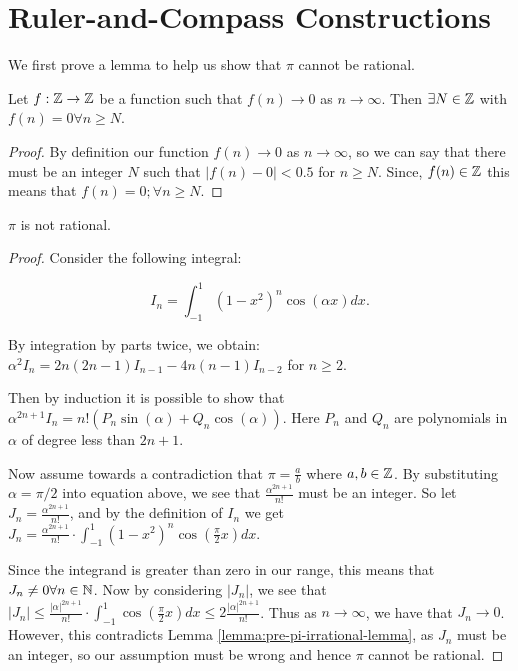 \section{Ruler-and-Compass Constructions} \label{sec:construction}
We first prove a lemma to help us show that $\pi$ cannot be rational.

\begin{lemma}\label{lemma:pre-pi-irrational-lemma}
    Let $f:\mathbb Z \rightarrow \mathbb Z$ be a function such that $f(n)\rightarrow 0$ as $n \rightarrow \infty$. Then $\exists N \in \mathbb Z$ with $f(n)=0 \forall n\geq N$.
\end{lemma}

\begin{proof}
    By definition our function $f(n) \rightarrow 0$ as $n \rightarrow \infty$, so we can say that there must be an integer $N$ such that $|f(n)-0|<0.5$ for $n\geq N$. Since, $f(n) \in \mathbb Z$ this means that $f(n)=0; \forall n \geq N$.
\end{proof}

\begin{theorem}
    $\pi$ is not rational.
\end{theorem}

\begin{proof}

    Consider the following integral:

    $$I_n = \int_{-1}^{1} (1-x^2)^n \cos(\alpha x)dx. $$

    By integration by parts twice, we obtain:
    $\alpha^2I_n=2n(2n-1)I_{n-1}-4n(n-1)I_{n-2}$ for $n\geq 2$.

    Then by induction it is possible to show that $\alpha^{2n+1}I_n=n!(P_n \sin(\alpha)+Q_n \cos(\alpha))$.
    Here $P_n$ and $Q_n$ are polynomials in $\alpha$ of degree less than $2n+1$.

    Now assume towards a contradiction that $\pi = \frac{a}{b}$ where $a,b\in \mathbb Z$. By substituting $\alpha = \pi/2$ into equation above, we see that $\frac{\alpha^{2n+1}}{n!}$ must be an integer. So let $J_n = \frac{\alpha^{2n+1}}{n!}$, and by the definition of $I_n$ we get $J_n = \frac{\alpha^{2n+1}}{n!}\cdot \int_{-1}^{1} (1-x^2)^n \cos(\frac{\pi}{2} x)dx$.

    Since the integrand is greater than zero in our range, this means that $J_n \neq 0 \forall n \in \mathbb N$. Now by considering $|J_n|$, we see that $|J_n| \leq \frac{|\alpha|^{2n+1}}{n!} \cdot \int_{-1}^1 \cos(\frac{\pi}{2}x)dx \leq 2\frac{|\alpha|^{2n+1}}{n!}$. Thus as $n\rightarrow \infty$, we have that $J_n\rightarrow 0$. However, this contradicts Lemma \ref{lemma:pre-pi-irrational-lemma}, as $J_n$ must be an integer, so our assumption must be wrong and hence $\pi$ cannot be rational.
\end{proof}

